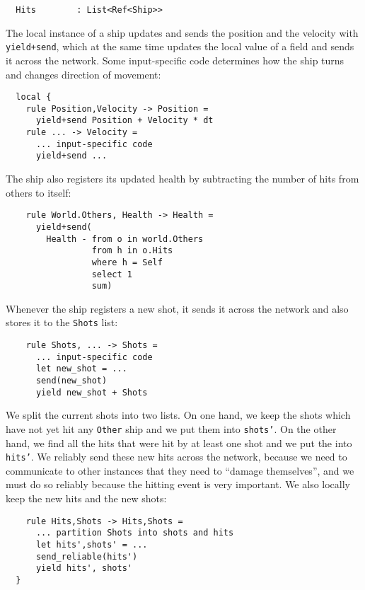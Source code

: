 \begin{lstlisting}
  Hits        : List<Ref<Ship>>
\end{lstlisting}

The local instance of a ship updates and sends the position and the velocity with \texttt{yield+send}, which at the same time updates the local value of a field and sends it across the network. Some input-specific code determines how the ship turns and changes direction of movement:

\begin{lstlisting}
  local {
    rule Position,Velocity -> Position = 
      yield+send Position + Velocity * dt
    rule ... -> Velocity = 
      ... input-specific code
      yield+send ...
\end{lstlisting}

The ship also registers its updated health by subtracting the number of hits from others to itself:

\begin{lstlisting}
    rule World.Others, Health -> Health = 
      yield+send(
        Health - from o in world.Others
                 from h in o.Hits
                 where h = Self
                 select 1
                 sum)
\end{lstlisting}

Whenever the ship registers a new shot, it sends it across the network and also stores it to the \texttt{Shots} list:

\begin{lstlisting}
    rule Shots, ... -> Shots = 
      ... input-specific code
      let new_shot = ...
      send(new_shot)
      yield new_shot + Shots
\end{lstlisting}

We split the current shots into two lists. On one hand, we keep the shots which have not yet hit any \texttt{Other} ship and we put them into \texttt{shots'}. On the other hand, we find all the hits that were hit by at least one shot and we put the into \texttt{hits'}. We reliably send these new hits across the network, because we need to communicate to other instances that they need to ``damage themselves'', and we must do so reliably because the hitting event is very important. We also locally keep the new hits and the new shots:

\begin{lstlisting}
    rule Hits,Shots -> Hits,Shots = 
      ... partition Shots into shots and hits
      let hits',shots' = ... 
      send_reliable(hits')
      yield hits', shots'
  }
\end{lstlisting}

